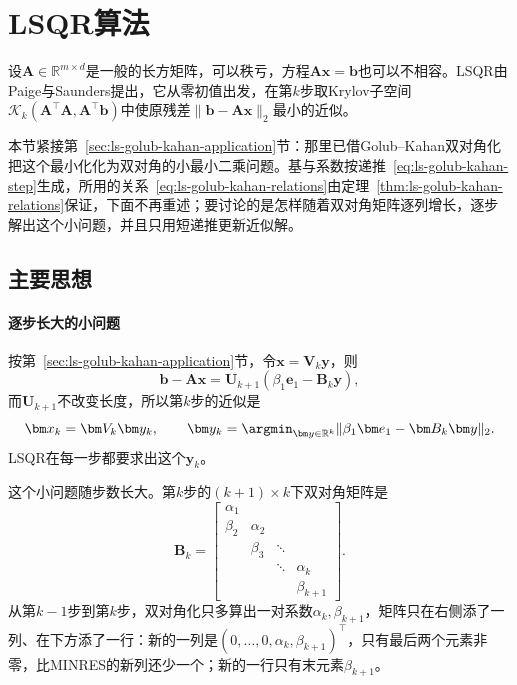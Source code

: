 \section{LSQR算法}
\label{sec:ls-lsqr}

设$\bm A\in\mathbb R^{m\times d}$是一般的长方矩阵，可以秩亏，方程$\bm A\bm x=\bm b$也可以不相容。LSQR由Paige与Saunders提出，它从零初值出发，在第$k$步取Krylov子空间$\mathcal K_k(\bm A^\top\bm A,\bm A^\top\bm b)$中使原残差$\lVert\bm b-\bm A\bm x\rVert_2$最小的近似。

本节紧接第~\ref{sec:ls-golub-kahan-application}节：那里已借Golub--Kahan双对角化把这个最小化化为双对角的小最小二乘问题。基与系数按递推~\eqref{eq:ls-golub-kahan-step}生成，所用的关系~\eqref{eq:ls-golub-kahan-relations}由定理~\ref{thm:ls-golub-kahan-relations}保证，下面不再重述；要讨论的是怎样随着双对角矩阵逐列增长，逐步解出这个小问题，并且只用短递推更新近似解。

\subsection{主要思想}

\paragraph{逐步长大的小问题}
按第~\ref{sec:ls-golub-kahan-application}节，令$\bm x=\bm V_k\bm y$，则
\[
 \bm b-\bm A\bm x=\bm U_{k+1}(\beta_1\bm e_1-\bm B_k\bm y),
\]
而$\bm U_{k+1}$不改变长度，所以第$k$步的近似是
\begin{equation}
 \bm x_k=\bm V_k\bm y_k,\qquad
 \bm y_k=\argmin_{\bm y\in\mathbb R^k}\lVert\beta_1\bm e_1-\bm B_k\bm y\rVert_2 .
 \label{eq:ls-lsqr-subproblem}
\end{equation}
LSQR在每一步都要求出这个$\bm y_k$。

这个小问题随步数长大。第$k$步的$(k+1)\times k$下双对角矩阵是
\[
 \bm B_k=
 \begin{bmatrix}
 \alpha_1&&&\\
 \beta_2&\alpha_2&&\\
 &\beta_3&\ddots&\\
 &&\ddots&\alpha_k\\
 &&&\beta_{k+1}
 \end{bmatrix}.
\]
从第$k-1$步到第$k$步，双对角化只多算出一对系数$\alpha_k,\beta_{k+1}$，矩阵只在右侧添了一列、在下方添了一行：新的一列是$(0,\ldots,0,\alpha_k,\beta_{k+1})^\top$，只有最后两个元素非零，比MINRES的新列还少一个；新的一行只有末元素$\beta_{k+1}$。

